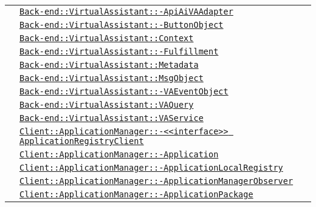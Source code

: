 \begin{longtable}{|>{\centering}m{3cm}|m{10cm}<{\centering}|}
& \hyperref[Back-end::VirtualAssistant::ApiAiVAAdapter]{\texttt{Back-end::VirtualAssistant::-\linebreak ApiAiVAAdapter}}\\
& \hyperref[Back-end::VirtualAssistant::ButtonObject]{\texttt{Back-end::VirtualAssistant::-\linebreak ButtonObject}}\\
& \hyperref[Back-end::VirtualAssistant::Context]{\texttt{Back-end::VirtualAssistant::Context}}\\
& \hyperref[Back-end::VirtualAssistant::Fulfillment]{\texttt{Back-end::VirtualAssistant::-\linebreak Fulfillment}}\\
& \hyperref[Back-end::VirtualAssistant::Metadata]{\texttt{Back-end::VirtualAssistant::Metadata}}\\
& \hyperref[Back-end::VirtualAssistant::MsgObject]{\texttt{Back-end::VirtualAssistant::MsgObject}}\\
& \hyperref[Back-end::VirtualAssistant::VAEventObject]{\texttt{Back-end::VirtualAssistant::-\linebreak VAEventObject}}\\
& \hyperref[Back-end::VirtualAssistant::VAQuery]{\texttt{Back-end::VirtualAssistant::VAQuery}}\\
& \hyperref[Back-end::VirtualAssistant::VAService]{\texttt{Back-end::VirtualAssistant::VAService}}\\
& \hyperref[Client::ApplicationManager::<<interface>> ApplicationRegistryClient]{\texttt{Client::ApplicationManager::-\linebreak <<interface>> ApplicationRegistryClient}}\\
& \hyperref[Client::ApplicationManager::Application]{\texttt{Client::ApplicationManager::-\linebreak Application}}\\
& \hyperref[Client::ApplicationManager::ApplicationLocalRegistry]{\texttt{Client::ApplicationManager::-\linebreak ApplicationLocalRegistry}}\\
& \hyperref[Client::ApplicationManager::ApplicationManagerObserver]{\texttt{Client::ApplicationManager::-\linebreak ApplicationManagerObserver}}\\
& \hyperref[Client::ApplicationManager::ApplicationPackage]{\texttt{Client::ApplicationManager::-\linebreak ApplicationPackage}}\\

\end{longtable}
